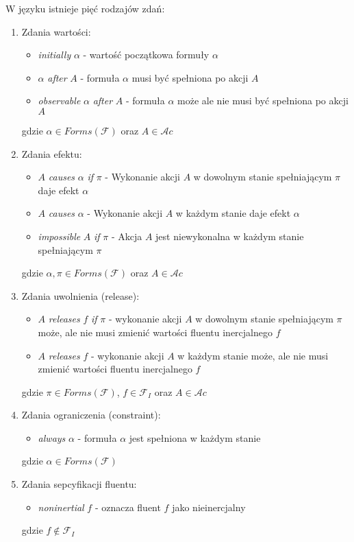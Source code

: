 \documentclass[11pt,a4paper]{article}
\begin{document}
W języku istnieje pięć rodzajów zdań:
\begin{enumerate}
    \item Zdania wartości:
    \begin{itemize}
        \item \textit{initially} $\alpha$ - wartość początkowa formuły $\alpha$
        \item $\alpha$ \textit{after} $A$ - formuła $\alpha$ musi być spełniona po akcji $A$
        \item \textit{observable} $\alpha$ \textit{after} $A$ - formuła $\alpha$ może ale nie musi być spełniona po akcji $A$
    \end{itemize}
        
    gdzie $\alpha \in Forms(\mathcal{F})$ oraz $A \in \mathcal{A}c$
    
    \item Zdania efektu:
    \begin{itemize}
        \item $A$ \textit{causes} $\alpha$ \textit{if} $\pi$ - Wykonanie akcji $A$ w dowolnym stanie spełniającym $\pi$ daje efekt $\alpha$
        \item $A$ \textit{causes} $\alpha$ - Wykonanie akcji $A$ w każdym stanie daje efekt $\alpha$
        \item \textit{impossible} $A$ \textit{if} $\pi$ - Akcja $A$ jest niewykonalna w każdym stanie spełniającym $\pi$
    \end{itemize}
    
    gdzie $\alpha, \pi \in Forms(\mathcal{F})$ oraz $A \in \mathcal{A}c$
    
    \item Zdania uwolnienia (release):
    \begin{itemize}
        \item $A$ \textit{releases} $f$ \textit{if} $\pi$ - wykonanie akcji $A$ w dowolnym stanie spełniającym $\pi$ może, ale nie musi zmienić wartości fluentu inercjalnego $f$
        \item $A$ \textit{releases} $f$ - wykonanie akcji $A$ w każdym stanie może, ale nie musi zmienić wartości fluentu inercjalnego $f$
    \end{itemize}
    
    gdzie $\pi \in Forms(\mathcal{F})$, $f \in \mathcal{F}_I$ oraz $A \in \mathcal{A}c$
    
    \item Zdania ograniczenia (constraint):
    \begin{itemize}
        \item \textit{always} $\alpha$ - formuła $\alpha$ jest spełniona w każdym stanie
    \end{itemize}
    gdzie $\alpha \in Forms(\mathcal{F})$
    
    \item Zdania sepcyfikacji fluentu:
    \begin{itemize}
        \item \textit{noninertial} $f$ - oznacza fluent $f$ jako nieinercjalny
    \end{itemize}
    gdzie $f \notin \mathcal{F}_I$
    
\end{enumerate}
\end{document}
